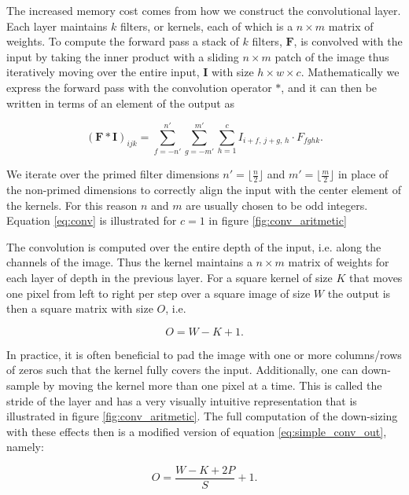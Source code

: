 The increased memory cost comes from how we construct the convolutional layer. Each layer maintains $k$ filters, or kernels, each of which is a $n\times m$ matrix of weights. To compute the forward pass a stack of $k$ filters, $\boldsymbol{F}$, is convolved with the input by taking the inner product with a sliding $n\times m$ patch of the image thus iteratively moving over the entire input, $\boldsymbol{I}$ with size $h \times w \times c$. Mathematically we express the forward pass with the convolution operator $*$, and it can then be written in terms of an element of the output as

\begin{equation}\label{eq:conv}
(\boldsymbol{F}*\boldsymbol{I})_{ijk} = 
\sum_{f=-n'}^{n'}\sum_{g=-m'}^{m'}\sum_{h=1} ^c
I_{i+f,\, j+g,\, h}\cdot F_{fghk}.
\end{equation}

\noindent We iterate over the primed filter dimensions $n'=\lfloor\frac{n}{2} \rfloor$ and $m' = \lfloor \frac{m}{2} \rfloor$ in place of the non-primed dimensions to correctly align the input with the center element of the kernels. For this reason $n$ and $m$ are usually chosen to be odd integers. Equation \ref{eq:conv} is illustrated for $c=1$ in figure \ref{fig:conv_aritmetic}   

The convolution is computed over the entire depth of the input, i.e. along the channels of the image. Thus the kernel maintains a $n\times m$ matrix of weights for each layer of depth in the previous layer. For a square kernel of size $K$ that moves one pixel from left to right per step over a square image of size $W$ the output is then a square matrix with size $O$, i.e.

\begin{equation}\label{eq:simple_conv_out}
O = W - K +1.
\end{equation}

\noindent In practice, it is often beneficial to pad the image with one or more columns/rows of zeros such that the kernel fully covers the input. Additionally, one can down-sample by moving the kernel more than one pixel at a time. This is called the stride of the layer and has a very visually intuitive representation that is illustrated in figure \ref{fig:conv_aritmetic}. The full computation of the down-sizing with these effects then is a modified version of equation \ref{eq:simple_conv_out}, namely: 

\begin{equation}\label{eq:conv_out}
O = \frac{W - K + 2P}{S} + 1.
\end{equation} 

